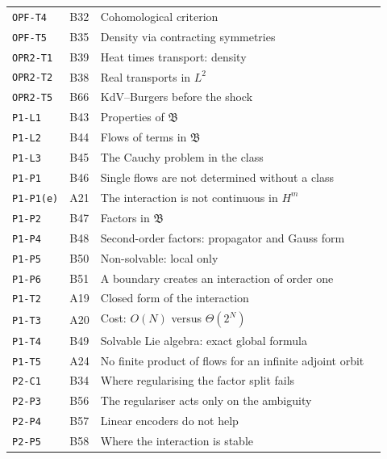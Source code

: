 \documentclass[11pt,a4paper,oneside]{report}
\newcommand{\Bclass}{\mathfrak{B}}
\begin{document}
\begin{center}
\begin{longtable}{@{}L{3.0cm}L{1.2cm}L{8.4cm}L{1.2cm}@{}}
\texttt{OPF-T4} & B32 & Cohomological criterion & \pageref{dim:OPF-T4}\\
\texttt{OPF-T5} & B35 & Density via contracting symmetries & \pageref{dim:OPF-T5}\\
\texttt{OPR2-T1} & B39 & Heat times transport: density & \pageref{dim:OPR2-T1}\\
\texttt{OPR2-T2} & B38 & Real transports in $L^2$ & \pageref{dim:OPR2-T2}\\
\texttt{OPR2-T5} & B66 & KdV--Burgers before the shock & \pageref{dim:OPR2-T5}\\
\texttt{P1-L1} & B43 & Properties of $\Bclass$ & \pageref{dim:P1-L1}\\
\texttt{P1-L2} & B44 & Flows of terms in $\Bclass$ & \pageref{dim:P1-L2}\\
\texttt{P1-L3} & B45 & The Cauchy problem in the class & \pageref{dim:P1-L3}\\
\texttt{P1-P1} & B46 & Single flows are not determined without a class & \pageref{dim:P1-P1}\\
\texttt{P1-P1(e)} & A21 & The interaction is not continuous in $H^m$ & \pageref{dim:P1-P1(e)}\\
\texttt{P1-P2} & B47 & Factors in $\Bclass$ & \pageref{dim:P1-P2}\\
\texttt{P1-P4} & B48 & Second-order factors: propagator and Gauss form & \pageref{dim:P1-P4}\\
\texttt{P1-P5} & B50 & Non-solvable: local only & \pageref{dim:P1-P5}\\
\texttt{P1-P6} & B51 & A boundary creates an interaction of order one & \pageref{dim:P1-P6}\\
\texttt{P1-T2} & A19 & Closed form of the interaction & \pageref{dim:P1-T2}\\
\texttt{P1-T3} & A20 & Cost: $O(N)$ versus $\Theta(2^N)$ & \pageref{dim:P1-T3}\\
\texttt{P1-T4} & B49 & Solvable Lie algebra: exact global formula & \pageref{dim:P1-T4}\\
\texttt{P1-T5} & A24 & No finite product of flows for an infinite adjoint orbit & \pageref{dim:P1-T5}\\
\texttt{P2-C1} & B34 & Where regularising the factor split fails & \pageref{dim:P2-C1}\\
\texttt{P2-P3} & B56 & The regulariser acts only on the ambiguity & \pageref{dim:P2-P3}\\
\texttt{P2-P4} & B57 & Linear encoders do not help & \pageref{dim:P2-P4}\\
\texttt{P2-P5} & B58 & Where the interaction is stable & \pageref{dim:P2-P5}\\

\end{longtable}
\end{center}
\end{document}
